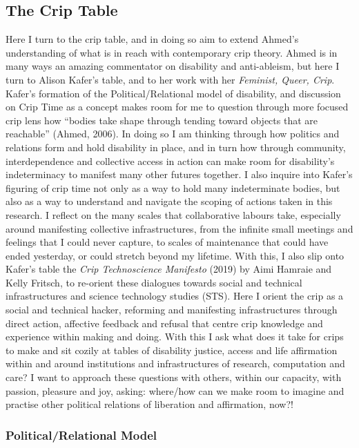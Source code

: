 \hypertarget{the-crip-table}{%
\subsection{The Crip Table}\label{the-crip-table}}

Here I turn to the crip table, and in doing so aim to extend Ahmed's
understanding of what is in reach with contemporary crip theory. Ahmed
is in many ways an amazing commentator on disability and anti-ableism,
but here I turn to Alison Kafer's table, and to her work with her
\emph{Feminist, Queer, Crip}. Kafer's formation of the
Political/Relational model of disability, and discussion on Crip Time as
a concept makes room for me to question through more focused crip lens
how ``bodies take shape through tending toward objects that are
reachable'' (Ahmed, 2006). In doing so I am thinking through how
politics and relations form and hold disability in place, and in turn
how through community, interdependence and collective access in action
can make room for disability's indeterminacy to manifest many other
futures together. I also inquire into Kafer's figuring of crip time not
only as a way to hold many indeterminate bodies, but also as a way to
understand and navigate the scoping of actions taken in this research. I
reflect on the many scales that collaborative labours take, especially
around manifesting collective infrastructures, from the infinite small
meetings and feelings that I could never capture, to scales of
maintenance that could have ended yesterday, or could stretch beyond my
lifetime. With this, I also slip onto Kafer's table the \emph{Crip
Technoscience Manifesto} (2019) by Aimi Hamraie and Kelly Fritsch, to
re-orient these dialogues towards social and technical infrastructures
and science technology studies (STS). Here I orient the crip as a social
and technical hacker, reforming and manifesting infrastructures through
direct action, affective feedback and refusal that centre crip knowledge
and experience within making and doing. With this I ask what does it
take for crips to make and sit cozily at tables of disability justice,
access and life affirmation within and around institutions and
infrastructures of research, computation and care? I want to approach
these questions with others, within our capacity, with passion, pleasure
and joy, asking: where/how can we make room to imagine and practise
other political relations of liberation and affirmation, now?!

\hypertarget{politicalrelational-model}{%
\subsubsection{Political/Relational
Model}\label{politicalrelational-model}}

